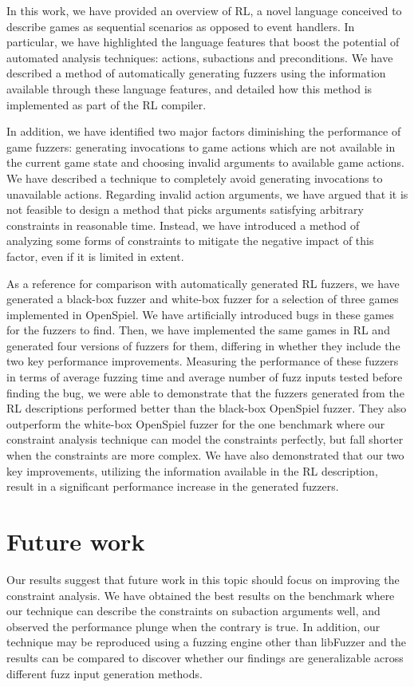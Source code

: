 In this work, we have provided an overview of RL, a novel language conceived to describe games as sequential scenarios as opposed to event handlers.
In particular, we have highlighted the language features that boost the potential of automated analysis techniques: actions, subactions and preconditions.
We have described a method of automatically generating fuzzers using the information available through these language features, and detailed how this method is implemented as part of the RL compiler.

In addition, we have identified two major factors diminishing the performance of game fuzzers: generating invocations to game actions which are not available in the current game state and 
    choosing invalid arguments to available game actions.
We have described a technique to completely avoid generating invocations to unavailable actions.
Regarding invalid action arguments, we have argued that it is not feasible to design a method that picks arguments satisfying arbitrary constraints in reasonable time.
Instead, we have introduced a method of analyzing some forms of constraints to mitigate the negative impact of this factor, even if it is limited in extent.

As a reference for comparison with automatically generated RL fuzzers, we have generated a black-box fuzzer and white-box fuzzer for a selection of three games implemented in OpenSpiel.
We have artificially introduced bugs in these games for the fuzzers to find.
Then, we have implemented the same games in RL and generated four versions of fuzzers for them, differing in whether they include the two key performance improvements.
Measuring the performance of these fuzzers in terms of average fuzzing time and average number of fuzz inputs tested before finding the bug, we were able to demonstrate that the fuzzers generated from the RL descriptions performed better than the black-box OpenSpiel fuzzer.
They also outperform the white-box OpenSpiel fuzzer for the one benchmark where our constraint analysis technique can model the constraints perfectly, but fall shorter when the constraints are more complex.
We have also demonstrated that our two key improvements, utilizing the information available in the RL description, result in a significant performance increase in the generated fuzzers.

\section{Future work}
Our results suggest that future work in this topic should focus on improving the constraint analysis.
We have obtained the best results on the benchmark where our technique can describe the constraints on subaction arguments well, and observed the performance plunge when the contrary is true.
In addition, our technique may be reproduced using a fuzzing engine other than libFuzzer and the results can be compared to discover whether our findings are generalizable across different fuzz input generation methods.

